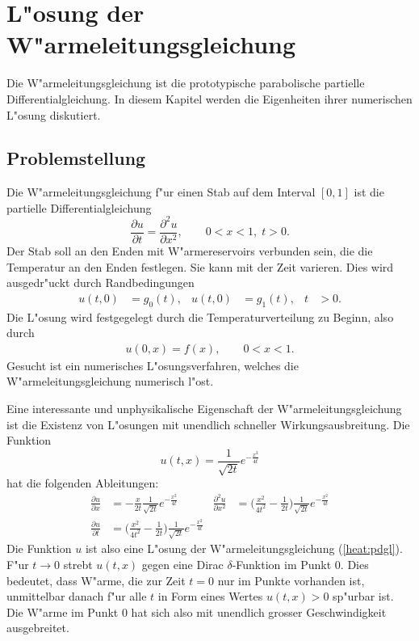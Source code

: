 \chapter{L"osung der W"armeleitungsgleichung}


{\parindent0pt
Die W"armeleitungsgleichung ist die prototypische parabolische
partielle Differentialgleichung.
In diesem Kapitel werden die Eigenheiten ihrer numerischen L"osung
diskutiert.}

\section{Problemstellung}
Die W"armeleitungsgleichung f"ur einen Stab
auf dem Interval $[0,1]$ ist die partielle Differentialgleichung
\begin{equation}
\frac{\partial u}{\partial t}=\frac{\partial^2 u}{\partial x^2}, \qquad
0<x<1,\;t>0.
\label{heat:pdgl}
\end{equation}
Der Stab soll an den Enden mit W"armereservoirs verbunden sein, die
die Temperatur an den Enden festlegen. Sie kann mit der Zeit varieren.
Dies wird ausgedr"uckt durch
Randbedingungen
\begin{align}
u(t,0)&=g_0(t),
&
u(t,0)&=g_1(t),&t&>0.
\label{heat:rand}
\end{align}
Die L"osung wird festgegelegt durch die Temperaturverteilung zu Beginn,
also durch
\begin{align}
u(0,x)=f(x),\qquad 0<x<1.
\end{align}
Gesucht ist ein numerisches L"osungsverfahren, welches die
W"armeleitungsgleichung numerisch l"ost.

Eine interessante und unphysikalische Eigenschaft der W"armeleitungsgleichung
ist die Existenz von L"osungen mit unendlich schneller Wirkungsausbreitung.
Die Funktion
\begin{equation}
u(t,x)=\frac1{\sqrt{2t}}e^{-\frac{x^2}{4t}}
\label{heat:solution}
\end{equation}
hat die folgenden Ableitungen:
\begin{align*}
\frac{\partial u}{\partial x}&=
-
\frac{x}{2t}\frac1{\sqrt{2t}}
e^{-\frac{x^2}{4t}}
&
\frac{\partial^2 u}{\partial x^2}&=
\biggl(\frac{x^2}{4t^2}-\frac1{2t}\biggr)
\frac1{\sqrt{2t}}
e^{-\frac{x^2}{4t}}
\\
\frac{\partial u}{\partial t}&=
\biggl(\frac{x^2}{4t^2}-\frac1{2t}\biggr)
\frac1{\sqrt{2t}}
e^{-\frac{x^2}{4t}}
\end{align*}
Die Funktion $u$ ist also eine L"osung der W"armeleitungsgleichung
(\ref{heat:pdgl}).
F"ur $t\to 0$ strebt $u(t,x)$ gegen eine Dirac $\delta$-Funktion
im Punkt 0.
Dies bedeutet, dass W"arme, die zur Zeit $t=0$ nur im Punkte vorhanden
ist, unmittelbar danach f"ur alle $t$ in Form eines Wertes $u(t,x) > 0$
sp"urbar ist.
Die W"arme im Punkt $0$ hat sich also mit unendlich grosser Geschwindigkeit
ausgebreitet.

